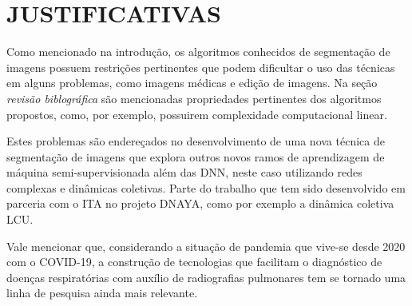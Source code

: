 \chapter{JUSTIFICATIVAS}\label{cap:justificativas}

Como mencionado na introdução, os algoritmos conhecidos de segmentação
de imagens possuem restrições pertinentes que podem dificultar o uso
das técnicas em alguns problemas, como imagens médicas e edição de
imagens. Na seção \textit{revisão biblográfica} são mencionadas propriedades
pertinentes dos algoritmos propostos, como, por exemplo, possuirem complexidade
computacional linear.

Estes problemas são endereçados no desenvolvimento de uma nova técnica
de segmentação de imagens que explora outros novos ramos de
aprendizagem de máquina semi-supervisionada além das \gls{DNN}, neste
caso utilizando redes complexas e dinâmicas coletivas. Parte do
trabalho que tem sido desenvolvido em parceria com o \gls{ITA} no
projeto DNAYA\cite{DnayaMotivation}, como por exemplo a dinâmica coletiva \gls{LCU}.

Vale mencionar que, considerando a situação de pandemia que vive-se
desde 2020 com o COVID-19, a construção de tecnologias que facilitam o
diagnóstico de doenças respiratórias com auxílio de radiografias
pulmonares tem se tornado uma linha de pesquisa ainda mais relevante.
